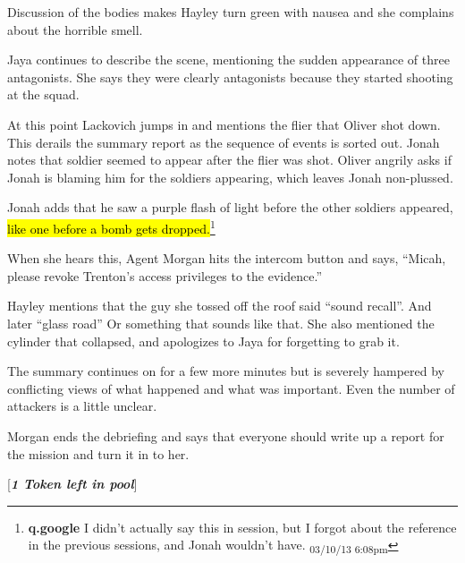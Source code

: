 Discussion of the bodies makes Hayley turn green with nausea and she complains about the horrible smell.  



Jaya continues to describe the scene, mentioning the sudden appearance of three antagonists.  She says they were clearly antagonists because they started shooting at the squad.



At this point Lackovich jumps in and mentions the flier that Oliver shot down.  This derails the summary report as the sequence of events is sorted out.  Jonah notes that soldier seemed to appear after the flier was shot.  Oliver angrily asks if Jonah is blaming him for the soldiers appearing, which leaves Jonah non-plussed.



Jonah adds that he saw a purple flash of light before the other soldiers appeared, \hl{like one before a bomb gets dropped.}\footnote{\textbf{q.google }I didn't actually say this in session, but I forgot about the reference in the previous sessions, and Jonah wouldn't have. \textsubscript{03/10/13 6:08pm}}



When she hears this, Agent Morgan hits the intercom button and says, ``Micah, please revoke Trenton's access privileges to the evidence.''



Hayley mentions that the guy she tossed off the roof said ``sound recall''.  And later ``glass road''  Or something that sounds like that.  She also mentioned the cylinder that collapsed, and apologizes to Jaya for forgetting to grab it.  



The summary continues on for a few more minutes but is severely hampered by conflicting views of what happened and what was important.  Even the number of attackers is a little unclear.



Morgan ends the debriefing and says that everyone should write up a report for the mission and turn it in to her.



{[}\textit{\textbf{1 Token left in pool}}{]}





